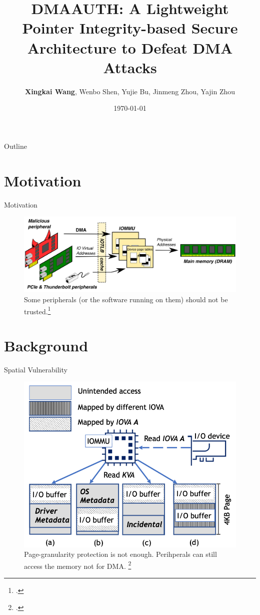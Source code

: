 \documentclass[10pt,aspectratio=169,mathserif]{beamer}
\title{DMAAUTH: A Lightweight Pointer Integrity-based Secure Architecture to Defeat DMA Attacks}
\author{\textbf{Xingkai Wang}, Wenbo Shen, Yujie Bu, Jinmeng Zhou, Yajin Zhou}
\institute{Zhejiang University}
\date{\today{}}
\begin{document}
\begin{frame}
	\titlepage
\end{frame}

\begin{frame}{Outline}
	\tableofcontents
\end{frame}

\section{Motivation}
\begin{frame}{Motivation}
	\begin{figure}
		\centering
		\includegraphics[width=\linewidth]{./images/motivation.png}
		\caption{Some peripherals (or the software running on them) should not be trusted.\footcite{thunderclap}}
	\end{figure}
\end{frame}

\section{Background}
\begin{frame}{Spatial Vulnerability}
	\begin{figure}
		\centering
		\includegraphics[width=0.45\linewidth]{./images/spatial.png}
		\caption{Page-granularity protection is not enough. Perihperals can still access the memory not for DMA. \footcite{char}}
	\end{figure}	
\end{frame}
\end{document}

